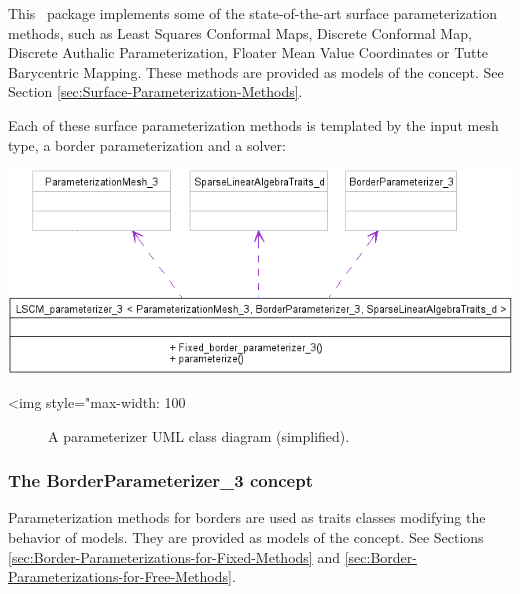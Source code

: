 This \cgal\ package implements some of the state-of-the-art
surface parameterization methods, such as Least Squares Conformal Maps,
Discrete Conformal Map, Discrete Authalic
Parameterization, Floater Mean Value Coordinates or Tutte Barycentric
Mapping. These methods are provided as models of the
 concept. See Section \ref{sec:Surface-Parameterization-Methods}.

Each of these surface parameterization methods is templated by
the input mesh type, a border parameterization and a solver:

\begin{center}
    \label{Surface_mesh_parameterization-fig-parameterizer_class_diagram_simplified}
    \begin{ccTexOnly}
        \includegraphics[width=1.0\textwidth]{Surface_mesh_parameterization/parameterizer_class_diagram_simplified}
    \end{ccTexOnly}
    \begin{ccHtmlOnly}
        <img style="max-width: 100%
    \end{ccHtmlOnly}
    \begin{figure}[h]
        \caption{A parameterizer UML class diagram (simplified).}
    \end{figure}
\end{center}


\subsubsection{The BorderParameterizer\_3 concept}

Parameterization methods for
borders are used as traits classes modifying the behavior of
 models.
They are provided as models of the  concept.
See Sections \ref{sec:Border-Parameterizations-for-Fixed-Methods}
and \ref{sec:Border-Parameterizations-for-Free-Methods}.


